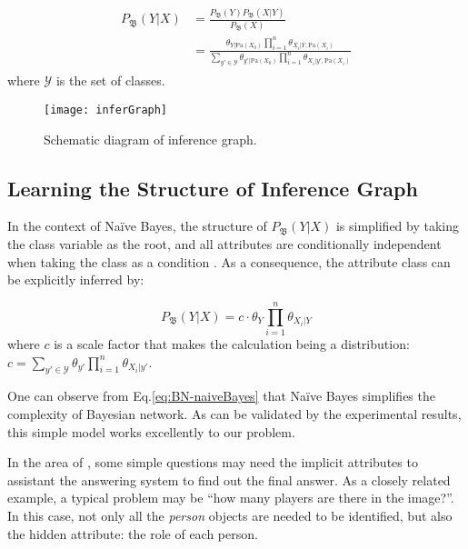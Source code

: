 \vspace{-1ex}
\begin{align}\label{eq:BNWithCls}
\begin{split}
P_\mathfrak{B}(Y|{X}) & = 
\frac{ P_\mathfrak{B}(Y) P_\mathfrak{B}({X}|Y) }{P_\mathfrak{B}({X})}\\
&=\frac{ \theta_{Y|\text{Pa}({X}_0)} \prod_{i=1}^{n} \theta_{X_i|Y, \text{Pa}({X}_i)} }{ \sum_{y'\in \mathcal{Y}} \theta_{y'|\text{Pa}({X}_0)} \prod_{i=1}^{n} \theta_{X_i|y', \text{Pa}({X}_i)} }
\end{split}
\end{align}
where $\mathcal{Y}$ is the set of classes.

\begin{figure}[tb]
\centering
\texttt{[image: inferGraph]}
\caption{Schematic diagram of inference graph.}
\vspace{-4ex}
\label{fig:inferGraphWork}
\end{figure}

\subsection{Learning the Structure of Inference Graph}

In the context of Na\"{i}ve Bayes, 
the structure of $P_\mathfrak{B}(Y|{X})$ is simplified by taking the class variable as the root, and all attributes are conditionally independent when taking the class as a condition \cite{petitjean2018accurate}. As a consequence, the attribute class can be explicitly inferred by:

\begin{equation}\label{eq:BN-naiveBayes}
P_\mathfrak{B}(Y| {X}) = c \cdot \theta_Y \prod_{i=1}^{n}\theta_{X_i|Y}
\end{equation}
where $c$ is a scale factor that makes the calculation being a distribution: $c=\sum_{y'\in \mathcal{Y}}  \theta_{y'} \prod_{i=1}^{n}\theta_{X_i|y'}$.

One can observe from Eq.\eqref{eq:BN-naiveBayes} that Na\"{i}ve Bayes simplifies the complexity of Bayesian network. As can be validated by the experimental results, this simple model works excellently to our problem. 

In the area of \vqa, some simple questions may need the implicit attributes to assistant the answering system to find out the final answer. 
As a closely related example, a typical problem may be ``how many players are there in the image?''. 
In this case, not only all the \emph{person} objects are needed to be identified, but also the hidden attribute: the role of each person. 

